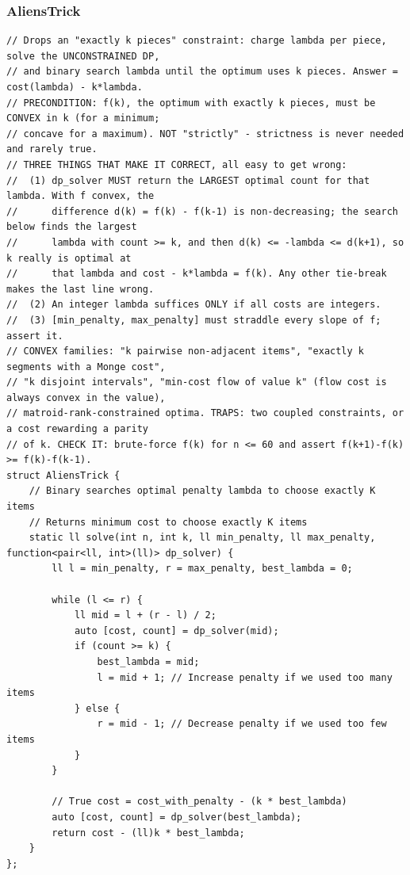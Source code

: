 \documentclass[9pt,a4paper,twocolumn]{extarticle}
\begin{document}
\filbreak
\subsubsection{AliensTrick}
\nopagebreak
\begin{lstlisting}
// Drops an "exactly k pieces" constraint: charge lambda per piece, solve the UNCONSTRAINED DP,
// and binary search lambda until the optimum uses k pieces. Answer = cost(lambda) - k*lambda.
// PRECONDITION: f(k), the optimum with exactly k pieces, must be CONVEX in k (for a minimum;
// concave for a maximum). NOT "strictly" - strictness is never needed and rarely true.
// THREE THINGS THAT MAKE IT CORRECT, all easy to get wrong:
//  (1) dp_solver MUST return the LARGEST optimal count for that lambda. With f convex, the
//      difference d(k) = f(k) - f(k-1) is non-decreasing; the search below finds the largest
//      lambda with count >= k, and then d(k) <= -lambda <= d(k+1), so k really is optimal at
//      that lambda and cost - k*lambda = f(k). Any other tie-break makes the last line wrong.
//  (2) An integer lambda suffices ONLY if all costs are integers.
//  (3) [min_penalty, max_penalty] must straddle every slope of f; assert it.
// CONVEX families: "k pairwise non-adjacent items", "exactly k segments with a Monge cost",
// "k disjoint intervals", "min-cost flow of value k" (flow cost is always convex in the value),
// matroid-rank-constrained optima. TRAPS: two coupled constraints, or a cost rewarding a parity
// of k. CHECK IT: brute-force f(k) for n <= 60 and assert f(k+1)-f(k) >= f(k)-f(k-1).
struct AliensTrick {
    // Binary searches optimal penalty lambda to choose exactly K items
    // Returns minimum cost to choose exactly K items
    static ll solve(int n, int k, ll min_penalty, ll max_penalty, function<pair<ll, int>(ll)> dp_solver) {
        ll l = min_penalty, r = max_penalty, best_lambda = 0;

        while (l <= r) {
            ll mid = l + (r - l) / 2;
            auto [cost, count] = dp_solver(mid);
            if (count >= k) {
                best_lambda = mid;
                l = mid + 1; // Increase penalty if we used too many items
            } else {
                r = mid - 1; // Decrease penalty if we used too few items
            }
        }

        // True cost = cost_with_penalty - (k * best_lambda)
        auto [cost, count] = dp_solver(best_lambda);
        return cost - (ll)k * best_lambda;
    }
};
\end{lstlisting}
\end{document}
